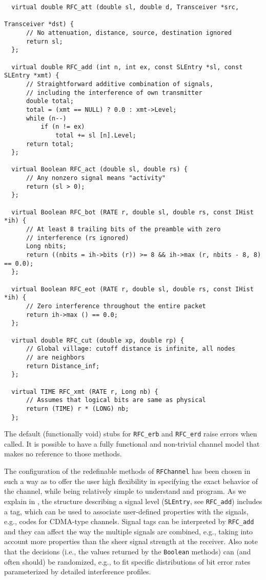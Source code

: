 {\small\begin{verbatim}
  virtual double RFC_att (double sl, double d, Transceiver *src,
                                                              Transceiver *dst) {
      // No attenuation, distance, source, destination ignored
      return sl;
  };

  virtual double RFC_add (int n, int ex, const SLEntry *sl, const SLEntry *xmt) {
      // Straightforward additive combination of signals,
      // including the interference of own transmitter
      double total;
      total = (xmt == NULL) ? 0.0 : xmt->Level;
      while (n--)
          if (n != ex)
              total += sl [n].Level;
      return total;
  };

  virtual Boolean RFC_act (double sl, double rs) {
      // Any nonzero signal means "activity"
      return (sl > 0);
  };

  virtual Boolean RFC_bot (RATE r, double sl, double rs, const IHist *ih) {
      // At least 8 trailing bits of the preamble with zero
      // interference (rs ignored)
      Long nbits;
      return ((nbits = ih->bits (r)) >= 8 && ih->max (r, nbits - 8, 8) == 0.0);
  };

  virtual Boolean RFC_eot (RATE r, double sl, double rs, const IHist *ih) {
      // Zero interference throughout the entire packet
      return ih->max () == 0.0;
  };

  virtual double RFC_cut (double xp, double rp) {
      // Global village: cutoff distance is infinite, all nodes
      // are neighbors
      return Distance_inf;
  };

  virtual TIME RFC_xmt (RATE r, Long nb) {
      // Assumes that logical bits are same as physical
      return (TIME) r * (LONG) nb;
  };
\end{verbatim}}

The default (functionally void) stubs for {\tt RFC\_erb} and {\tt RFC\_erd}
raise errors when called.
It is possible to have a fully functional and non-trivial channel model that
makes no reference to those methods.

The configuration of the redefinable methods of {\tt RFChannel} has been
chosen in such a way as to offer the user high flexibility in specifying
the exact behavior of the channel, while being relatively simple to 
understand and program.
As we explain in , the structure describing a signal level
({\tt SLEntry}, see {\tt RFC\_add})
includes a tag, which can be used to associate user-defined
properties with the signals, e.g., codes for CDMA-type channels.
Signal tags can be interpreted by {\tt RFC\_add} and they can affect
the way the multiple signals are combined,
e.g., taking into account more properties than the sheer signal
strength at the receiver.
Also note that the decisions (i.e., the values returned by the {\tt Boolean}
methods) can (and often should) be randomized,
e.g., to fit specific distributions of bit
error rates parameterized by detailed interference profiles.

